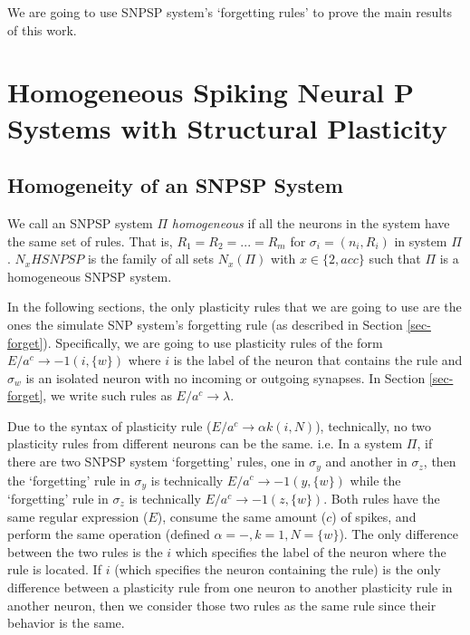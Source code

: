 \documentclass[runningheads,a4paper]{llncs}
\begin{document}
We are going to use SNPSP system's `forgetting rules' to prove the main results of this work.


\section{Homogeneous Spiking Neural P Systems with Structural Plasticity} \label{homogeneous-snpsp}


\subsection{Homogeneity of an SNPSP System}

We call an SNPSP system $\Pi$ \textit{homogeneous} if all the neurons in the system have the same set of rules. That is, $R_1 = R_2 = ... = R_m$
for $\sigma_i = (n_i, R_i)$ in system $\Pi$. $N_xHSNPSP$ is the family of all sets $N_x(\Pi)$ with $x \in \{2, acc\}$ such that $\Pi$ is a homogeneous
SNPSP system.  

In the following sections, the only plasticity rules that we are going to use are the ones the simulate SNP system's forgetting rule (as described in
Section \ref{sec-forget}). Specifically, we are going to use plasticity rules of the form $E/a^c \rightarrow -1(i,\{w\})$ where $i$ is the label of
the neuron that contains the rule and $\sigma_w$ is an isolated neuron with no incoming or outgoing synapses. In Section \ref{sec-forget}, we write
such rules as $E/a^c \rightarrow \lambda$. 

Due to the syntax of plasticity rule ($E/a^c \rightarrow \alpha k (i, N)$), technically, no two plasticity rules from different neurons can be the
same. i.e. In a system $\Pi$, if there are two SNPSP system `forgetting' rules, one in $\sigma_y$ and another in $\sigma_z$, then the `forgetting'
rule in $\sigma_y$ is technically  $E/a^c \rightarrow -1(y,\{w\})$ while the `forgetting' rule in $\sigma_z$ is technically $E/a^c \rightarrow -1(z,
\{w\})$. Both rules have the same regular expression ($E$), consume the same amount ($c$) of spikes, and perform the same operation (defined 
$\alpha = -, k=1, N=\{w\}$). The only difference between the two rules is the $i$ which specifies the label of the neuron where the rule is located.
If $i$ (which specifies the neuron containing the rule) is the only difference between a plasticity rule from one neuron to another plasticity rule
in another neuron, then we consider those two rules as the same rule since their behavior is the same.
\end{document}

